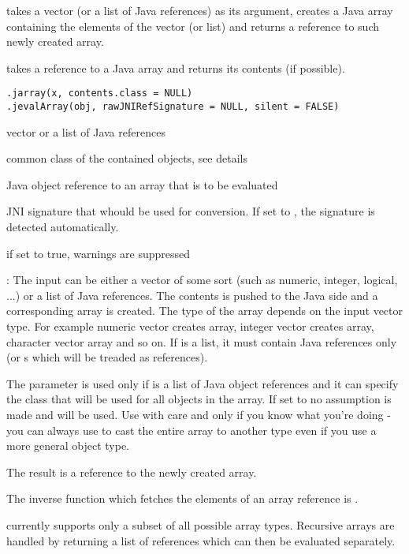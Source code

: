 \begin{Description}\relax
{} takes a vector (or a list of Java references) as its
argument, creates a Java array containing the elements of the vector
(or list) and returns a reference to such newly created array.

 takes a reference to a Java array and returns its
contents (if possible).
\end{Description}
\begin{Usage}
\begin{verbatim}
.jarray(x, contents.class = NULL)
.jevalArray(obj, rawJNIRefSignature = NULL, silent = FALSE)
\end{verbatim}
\end{Usage}
\begin{Arguments}
\begin{ldescription}
\item[\code{x}] vector or a list of Java references
\item[\code{contents.class}] common class of the contained objects, see
details
\item[\code{obj}] Java object reference to an array that is to be evaluated
\item[\code{rawJNIRefSignature}] JNI signature that whould be used for
conversion. If set to , the signature is detected
automatically.
\item[\code{silent}] if set to true, warnings are suppressed
\end{ldescription}
\end{Arguments}
\begin{Details}\relax
{}: The input can be either a vector of some sort (such as
numeric, integer, logical, ...) or a list of Java references. The
contents is pushed to the Java side and a corresponding array is
created. The type of the array depends on the input vector type. For
example numeric vector creates  array, integer vector
creates  array, character vector  array and
so on. If  is a list, it must contain Java references only (or
s which will be treaded as  references).

The  parameter is used only if  is a list
of Java object references and it can specify the class that will be
used for all objects in the array. If set to  no assumption
is made and  will be used. Use with care and
only if you know what you're doing - you can always use
 to cast the entire array to another type even if
you use a more general object type.

The result is a reference to the newly created array.

The inverse function which fetches the elements of an array reference
is .

 currently supports only a subset of all possible
array types. Recursive arrays are handled by returning a list of
references which can then be evaluated separately.
\end{Details}
